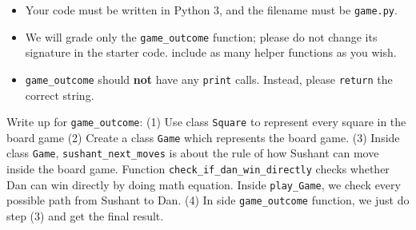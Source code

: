 \documentclass{assignment-263}
\begin{document}
\begin{enumerate}
		\begin{itemize}
		\item Your code must be written in Python 3, and the filename must be \verb|game.py|.
\item We will grade only the \verb|game_outcome| function; please do not change its signature in the starter code. include as many helper functions as you wish.
				\item \verb|game_outcome| should {\bf not} have any
				\verb|print| calls. Instead, please \verb|return| the correct string.
			\end{itemize}
			
\end{enumerate}
Write up for \verb|game_outcome|:\vskip5pt
(1) Use class \verb|Square| to represent every square in the board game\vskip5pt
(2) Create a class \verb|Game| which represents the board game.\vskip5pt
(3) Inside class \verb|Game|, \verb|sushant_next_moves| is about the rule of how Sushant can move inside the board game. Function \verb|check_if_dan_win_directly| checks whether Dan can win directly by doing math equation. Inside \verb|play_Game|, we check every possible path from Sushant to Dan.\vskip5pt
(4) In side \verb|game_outcome| function, we just do step (3) and get the final result.
\end{document}
